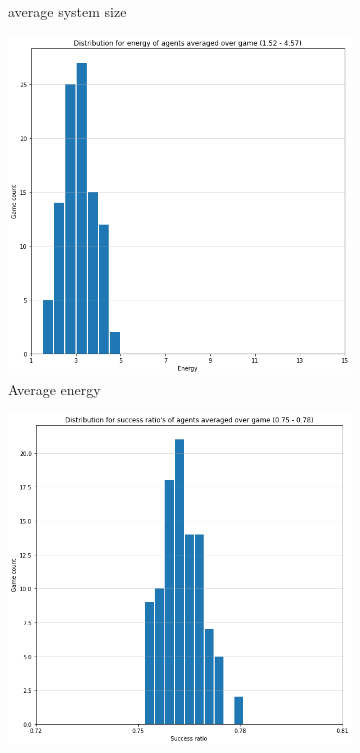 \begin{figure}[ht]
\begin{subfigure}{.30\textwidth}
        \captionsetup{width=0.9\linewidth}
        \captionsetup{justification=centering}
        \caption{average system size}
    \end{subfigure}
    \hspace{0.5cm}
    \begin{subfigure}{.30\textwidth}
        \centering
        \includegraphics[width=\textwidth]{images/results/all_energy.png}
        \captionsetup{width=0.9\linewidth}
        \captionsetup{justification=centering}
        \caption{Average energy}
    \end{subfigure}
    \begin{subfigure}{.30\textwidth}
        \centering
        \includegraphics[width=\textwidth]{images/results/high_success.png}

\end{subfigure}
\end{figure}
